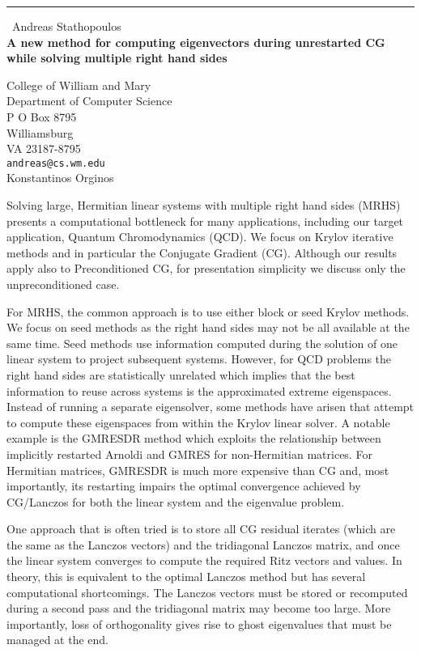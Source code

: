 \documentclass{report}
\begin{document}
\begin{center}
\rule{6in}{1pt} \
{\large Andreas Stathopoulos \\
{\bf A new method for computing eigenvectors during unrestarted CG while solving multiple right hand sides}}

College of William and Mary \\ Department of Computer Science \\ P O Box 8795 \\ Williamsburg \\ VA 23187-8795
\\
{\tt andreas@cs.wm.edu}\\
Konstantinos Orginos\end{center}

Solving large, Hermitian linear systems with multiple right hand sides (MRHS)
presents a computational bottleneck for many applications,
including our target application, Quantum Chromodynamics (QCD).
We focus on Krylov iterative methods and in particular the Conjugate Gradient (CG).
Although our results apply also to Preconditioned CG,
for presentation simplicity we discuss only the unpreconditioned case.

For MRHS, the common approach is to use either block or seed Krylov methods.
We focus on seed methods as the right hand sides may not be all available
at the same time.
Seed methods use information computed during the solution of one
linear system to project subsequent systems.
However, for QCD problems the right hand sides are statistically
unrelated which implies that the best information to reuse across systems
is the approximated extreme eigenspaces.
Instead of running a separate eigensolver, some methods have arisen that
attempt to compute these eigenspaces from within the Krylov linear solver.
A notable example is the GMRESDR method which exploits the relationship
between implicitly restarted Arnoldi and GMRES for non-Hermitian matrices.
For Hermitian matrices, GMRESDR is much more expensive than CG and,
most importantly, its restarting impairs the optimal convergence
achieved by CG/Lanczos for both the linear system and the eigenvalue problem.

One approach that is often tried is to store all CG residual
iterates (which are the same as the Lanczos vectors) and the tridiagonal
Lanczos matrix, and once the linear system converges to compute the
required Ritz vectors and values.
In theory, this is equivalent to the optimal Lanczos method but
has several computational shortcomings.
The Lanczos vectors must be stored or recomputed during a second pass
and the tridiagonal matrix may become too large.
More importantly, loss of orthogonality gives rise to
ghost eigenvalues that must be managed at the end.
\end{document}
